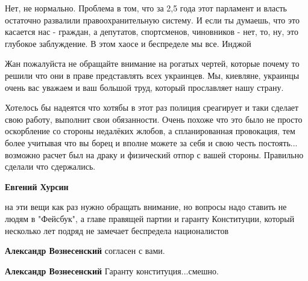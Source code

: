 \begin{itemize}
Нет, не нормально. Проблема в том, что за 2,5 года этот парламент и власть
остаточно развалили правоохранительную систему. И если ты думаешь, что это
касается нас - граждан, а депутатов, спортсменов, чиновников - нет, то, ну, это
глубокое заблуждение. В этом хаосе и беспределе мы все. Инджой
\Smiley[1.0][yellow]


Жан пожалуйста не обращайте внимание на рогатых чертей, которые почему то
решили что они в праве представлять всех украинцев. Мы, киевляне, украинцы
очень вас уважаем и ваш большой труд, который прославляет нашу страну.

Хотелось бы надеятся что хотябы в этот раз полиция среагирует и таки сделает
свою работу, выполнит свои обязанности. Очень похоже что это было не просто
оскорбление со стороны недалёких жлобов, а спланированная провокация, тем более
учитывая что вы борец и вполне можете за себя и свою честь постоять... возможно
расчет был на драку и физический отпор с вашей стороны. Правильно сделали что
сдержались.

\begin{itemize}

 
\textbf{Евгений Хурсин} 

на эти вещи как раз нужно обращать внимание, но вопросы
надо ставить не людям в "Фейсбук", а главе правящей партии и гаранту
Конституции, который несколько лет подряд не замечает беспредела националистов

 

\textbf{Александр Вознесенский} согласен с вами.


\textbf{Александр Вознесенский} Гаранту конституция...смешно.

 

\end{itemize}
\end{itemize}
